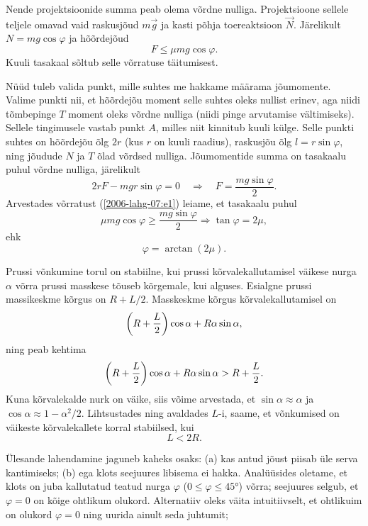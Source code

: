 \documentclass[10pt]{article}
\begin{document}
{Nende projektsioonide summa peab olema võrdne nulliga. Projektsioone sellele teljele omavad vaid raskusjõud $m\vec g$ ja kasti põhja toereaktsioon $\vec N$. Järelikult
$N = mg \cos \varphi$ ja hõõrdejõud
\begin{equation} \label{2006-lahg-07:e1}
F \leq \mu mg \cos\varphi.
\end{equation}
Kuuli tasakaal sõltub selle võrratuse täitumisest.

Nüüd tuleb valida punkt, mille suhtes me hakkame määrama jõumomente. Valime punkti nii, et hõõrdejõu moment selle suhtes oleks nullist erinev, aga niidi tõmbepinge $T$ moment oleks võrdne nulliga (niidi pinge arvutamise vältimiseks). Sellele tingimusele vastab punkt $A$, milles niit kinnitub kuuli külge. Selle punkti suhtes on hõõrdejõu õlg $2r$ (kus $r$ on kuuli raadius), raskusjõu õlg $l = r \sin \varphi$, ning jõudude $N$ ja $T$ õlad võrdsed nulliga. Jõumomentide summa on tasakaalu puhul võrdne nulliga, järelikult
\[
2 r F-m g r \sin \varphi=0 \quad \Rightarrow \quad F=\frac{m g \sin \varphi}{2}.
\]
Arvestades võrratust (\ref{2006-lahg-07:e1}) leiame, et tasakaalu puhul
\[
\mu m g \cos \varphi \geq \frac{m g \sin \varphi}{2} \Rightarrow \tan \varphi=2 \mu,
\]
ehk
\[
\varphi = \arctan (2\mu).
\]
\probend
\bigskip


\solu
Prussi võnkumine torul on stabiilne, kui prussi
kõrvalekallutamisel väikese nurga $\alpha$ võrra prussi masskese
tõuseb kõrgemale, kui alguses. Esialgne prussi massikeskme kõrgus on $R+L/2$.
Masskeskme kõrgus kõrvalekallutamisel on
\[\left(R+{L \over 2}\right)\cos\alpha+R\alpha\sin\alpha,\]
ning peab kehtima
\[\left(R+{L \over 2}\right)\cos\alpha+R\alpha\sin\alpha >R+{L \over 2}.\]
Kuna kõrvalekalde nurk on väike, siis võime arvestada, et
$\sin\alpha\approx \alpha$ ja $\cos\alpha\approx 1-\alpha^2/2$. Lihtsustades ning avaldades $L$-i, saame, et võnkumised on väikeste kõrvalekallete korral stabiilsed, kui
\[L<2R.\]
\probend
\bigskip


\solu
Ülesande lahendamine jaguneb kaheks osaks: (a) kas antud jõust piisab üle serva kantimiseks; (b) ega klots seejuures libisema ei hakka. Analüüsides oletame, et klots on juba kallutatud teatud nurga $\varphi$ ($0 \leq \varphi \leq \ang{45}$) võrra; seejuures selgub, et $\varphi = 0$ on kõige ohtlikum olukord. Alternatiiv oleks väita intuitiivselt, et ohtlikuim on olukord $\varphi = 0$ ning uurida ainult seda juhtumit;

}
\end{document}

